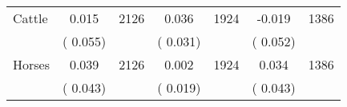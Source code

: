\begin{tabular}{l*{6}{c}}
Cattle        &              0.015      &       2126       &              0.036      &       1924       &             -0.019      &       1386       \\
                       &       (       0.055)            &                               &       (       0.031)            &                               &       (       0.052)            &                               \\
Horses        &              0.039      &       2126       &              0.002      &       1924       &              0.034      &       1386       \\
                       &       (       0.043)            &                               &       (       0.019)            &                               &       (       0.043)            &                               \\
\hline \end{tabular}